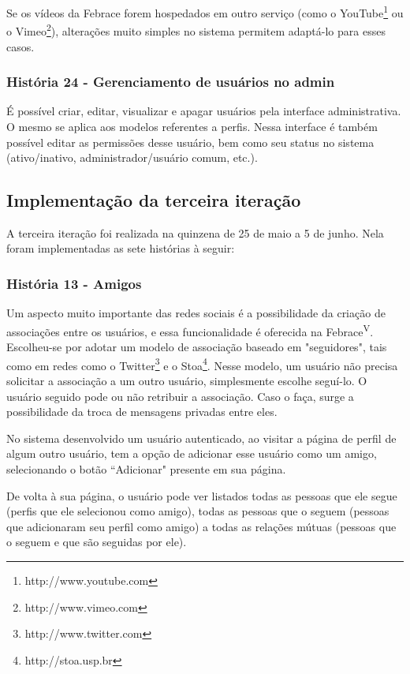       Se os vídeos da Febrace forem hospedados em outro serviço (como o YouTube\footnote{http://www.youtube.com} ou o Vimeo\footnote{http://www.vimeo.com}), alterações muito simples no sistema permitem adaptá-lo para esses casos.

    \subsubsection{História 24 - Gerenciamento de usuários no admin}
      É possível criar, editar, visualizar e apagar usuários pela interface administrativa. O mesmo se aplica aos modelos referentes a perfis. Nessa interface é também possível editar as permissões desse usuário, bem como seu status no sistema (ativo/inativo, administrador/usuário comum, etc.).

  \subsection{Implementação da terceira iteração}
    A terceira iteração foi realizada na quinzena de 25 de maio a 5 de junho. Nela foram implementadas as sete histórias à seguir:

    \subsubsection{História 13 - Amigos}
      Um aspecto muito importante das redes sociais é a possibilidade da criação de associações entre os usuários, e essa funcionalidade é oferecida na Febrace\textsuperscript{V}. Escolheu-se por adotar um modelo de associação baseado em "seguidores", tais como em redes como o Twitter\footnote{http://www.twitter.com} e o Stoa\footnote{http://stoa.usp.br}. Nesse modelo, um usuário não precisa solicitar a associação a um outro usuário, simplesmente escolhe seguí-lo. O usuário seguido pode ou não retribuir a associação. Caso o faça, surge a possibilidade da troca de mensagens privadas entre eles.

      No sistema desenvolvido um usuário autenticado, ao visitar a página de perfil de algum outro usuário, tem a opção de adicionar esse usuário como um amigo, selecionando o botão “Adicionar" presente em sua página.

      De volta à sua página, o usuário pode ver listados todas as pessoas que ele segue (perfis que ele selecionou como amigo), todas as pessoas que o seguem (pessoas que adicionaram seu perfil como amigo) a todas as relações mútuas (pessoas que o seguem e que são seguidas por ele).

